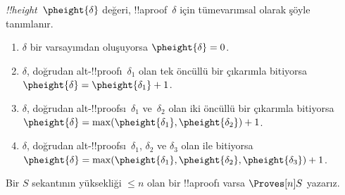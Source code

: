 \documentclass[../../../include/open-logic-section]{subfiles}
\begin{document}


\begin{defn}
\emph{!!{height}}~$\pheight{\delta}$ değeri, !!a{proof}~$\delta$ için
tümevarımsal olarak şöyle tanımlanır.
\begin{enumerate}
  \item $\delta$ bir varsayımdan oluşuyorsa $\pheight{\delta} = 0$.
  \item $\delta$, doğrudan alt-!!{proof}{}ı~$\delta_1$ olan tek öncüllü bir
  çıkarımla bitiyorsa $\pheight{\delta} = \pheight{\delta_1} + 1$.
  \item $\delta$, doğrudan alt-!!{proof}s{}ı~$\delta_1$ ve~$\delta_2$ olan iki
  öncüllü bir çıkarımla bitiyorsa $\pheight{\delta} =
  \max(\pheight{\delta_1}, \pheight{\delta_2}) + 1$.
  \item $\delta$, doğrudan alt-!!{proof}s{}ı~$\delta_1$, $\delta_2$ ve
  $\delta_3$ olan \Elim{\lor} ile bitiyorsa $\pheight{\delta} =
  \max(\pheight{\delta_1}, \pheight{\delta_2}, \pheight{\delta_3}) + 1$.
\end{enumerate}
Bir $S$ sekantının yüksekliği $\le n$ olan bir !!a{proof}{}ı varsa
$\Proves[n] S$ yazarız.
\end{defn}
\end{document}
